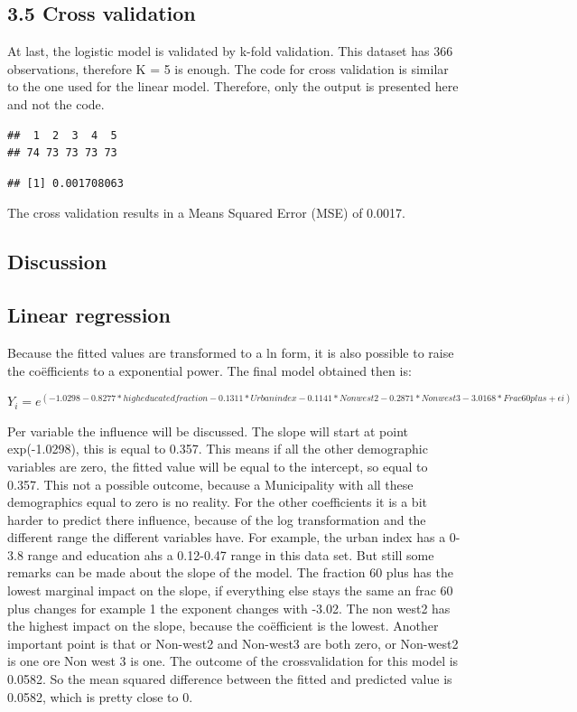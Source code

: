 \documentclass[11pt,]{article}
\begin{document}
\subsection{3.5 Cross validation}\label{cross-validation-1}

At last, the logistic model is validated by k-fold validation. This
dataset has 366 observations, therefore K = 5 is enough. The code for
cross validation is similar to the one used for the linear model.
Therefore, only the output is presented here and not the code.

\begin{verbatim}
##  1  2  3  4  5 
## 74 73 73 73 73
\end{verbatim}

\begin{verbatim}
## [1] 0.001708063
\end{verbatim}

The cross validation results in a Means Squared Error (MSE) of 0.0017.

\subsection{Discussion}\label{discussion}

\subsection{Linear regression}\label{linear-regression}

Because the fitted values are transformed to a ln form, it is also
possible to raise the coëfficients to a exponential power. The final
model obtained then is:

\(Y_i = e^(-1.0298 -0.8277*high educated fraction -0.1311*Urban index -0.1141*Non west2 -0.2871*Non west3 -3.0168*Frac 60plus + \epsilon i)\)

Per variable the influence will be discussed. The slope will start at
point exp(-1.0298), this is equal to 0.357. This means if all the other
demographic variables are zero, the fitted value will be equal to the
intercept, so equal to 0.357. This not a possible outcome, because a
Municipality with all these demographics equal to zero is no reality.
For the other coefficients it is a bit harder to predict there
influence, because of the log transformation and the different range the
different variables have. For example, the urban index has a 0-3.8 range
and education ahs a 0.12-0.47 range in this data set. But still some
remarks can be made about the slope of the model. The fraction 60 plus
has the lowest marginal impact on the slope, if everything else stays
the same an frac 60 plus changes for example 1 the exponent changes with
-3.02. The non west2 has the highest impact on the slope, because the
coëfficient is the lowest. Another important point is that or Non-west2
and Non-west3 are both zero, or Non-west2 is one ore Non west 3 is one.
The outcome of the crossvalidation for this model is 0.0582. So the mean
squared difference between the fitted and predicted value is 0.0582,
which is pretty close to 0.
\end{document}
